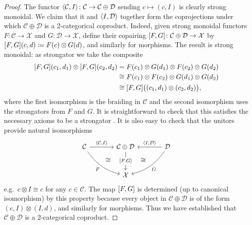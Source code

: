 \documentclass[11pt, oneside, article]{memoir}
\theoremstyle{plain}
\theoremstyle{definition}
\theoremstyle{remark}
\newcommand{\cat}[1]{\mathcal{#1}}%
\DeclarePairedDelimiter{\pair}{\langle}{\rangle}
\DeclarePairedDelimiter{\copair}{[}{]}
\newcommand{\hide}[2][]{#1}
\begin{document}
\begin{proof}
The functor $\pair{\cat{C},I}\colon\cat{C}\to\cat{C}\oplus\cat{D}$ sending $c\mapsto (c,I)$ is clearly strong monoidal. We claim that it and $\pair{I,\cat{D}}$ together form the coprojections under which $\cat{C}\oplus\cat{D}$ is a 2-categorical coproduct. Indeed, given strong monoidal functors $F\colon\cat{C}\to\cat{X}$ and $G\colon\cat{D}\to\cat{X}$, define their copairing $\copair{F,G}\colon\cat{C}\oplus\cat{D}\to\cat{X}$ by $\copair{F,G}(c,d)\coloneqq F(c)\otimes G(d)$, and similarly for morphisms. The result is strong monoidal: as strongator we take the composite
\begin{align*}
	\copair{F,G}(c_1,d_1)\otimes\copair{F,G}(c_2,d_2)&=
	F(c_1)\otimes G(d_1)\otimes F(c_2)\otimes G(d_2)\\&\cong
	F(c_1)\otimes F(c_2)\otimes G(d_1)\otimes G(d_2)\\&\cong
	\copair{F,G}\big((c_1,d_1)\otimes(c_2,d_2)\big),
\end{align*}
where the first isomorphism is the braiding in $\cat{C}$ and the second isomorphism uses the strongators from $F$ and $G$. It is straightforward to check that this satisfies the necessary axioms to be a strongator%
\hide[.]{
, e.g.\ the commutativity of the following diagram
\[
\begin{tikzcd}
	Fc_1\otimes Gd_1\otimes Fc_2\otimes Gd_2\otimes Fc_3\otimes Gd_3\ar[r, "\sigma"]\ar[d, "\sigma"']&
	Fc_1\otimes Gd_1\otimes Fc_2\otimes Fc_3\otimes Gd_2\otimes Gd_3\ar[d]\\
	Fc_1\otimes Fc_2\otimes Gc_1\otimes Gc_2\otimes Fc_3\otimes Gd_3\ar[d]&
	Fc_1\otimes Gd_1\otimes F(c_2\otimes c_3)\otimes G(d_2\otimes d_3)\ar[d, "\sigma"]\\
	F(c_1\otimes c_2)\otimes G(d_1\otimes d_2)\otimes Fc_3\otimes Gd_3\ar[d, "\sigma"']&
	Fc_1\otimes F(c_2\otimes c_3)\otimes Gd_1\otimes G(d_2\otimes d_3)\ar[d]\\
	F(c_1\otimes c_2)\otimes Fc_3\otimes G(d_1\otimes d_2)\otimes Gd_3\ar[r]&
	F(c_1\otimes c_2\otimes c_3)\otimes G(d_1\otimes d_2\otimes d_3)	
\end{tikzcd}
\]
}
It is also easy to check that the unitors provide natural isomorphisms
\begin{equation}\label{eqn.coproduct_smc}
\begin{tikzcd}[sep=large]
	\cat{C}\ar[r, "\pair{\cat{C},I}"]\ar[dr, bend right=20pt, "F"', "" name=F]&
	|[alias=CD]|\cat{C}\oplus\cat{D}\ar[d, "\copair{F,G}" description]&
	\cat{D}\ar[l, "\pair{I,\cat{D}}"']\ar[dl, bend left=20pt, "G", ""' name=G]\\&
	\cat{X}
	\ar[from=G, to=CD, phantom, near start, "\cong"]
	\ar[from=F, to=CD, phantom, near start, "\cong"]
\end{tikzcd}
\end{equation}
e.g.\ $c\otimes I\cong c$ for any $c\in\cat{C}$. The map $\copair{F,G}$ is determined (up to canonical isomorphism) by this property because every object in $\cat{C}\oplus\cat{D}$ is of the form $(c,I)\otimes(I,d)$, and similarly for morphisms. Thus we have established that $\cat{C}\oplus\cat{D}$ is a 2-categorical coproduct.


\end{proof}
\end{document}
